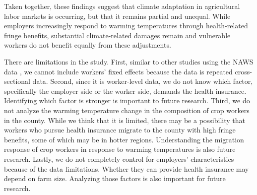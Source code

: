 \documentclass[12pt]{article}
\begin{document}
Taken together, these findings suggest that climate adaptation in agricultural labor markets is occurring, but that it remains partial and unequal. While employers increasingly respond to warming temperatures through health-related fringe benefits, substantial climate-related damages remain and vulnerable workers do not benefit equally from these adjustments.

There are limitations in the study. First, similar to other studies using the NAWS data \citep{kandilov_impact_2022, donkor_effects_2022, rutledge_health_2026}, we cannot include workers' fixed effects because the data is repeated cross-sectional data. Second, since it is worker-level data, we do not know which factor, specifically the employer side or the worker side, demands the health insurance. Identifying which factor is stronger is important to future research. Third, we do not analyze the warming temperature change in the composition of crop workers in the county. While we think that it is limited, there may be a possibility that workers who pursue health insurance migrate to the county with high fringe benefits, some of which may be in hotter regions. Understanding the migration response of crop workers in response to warming temperatures is also future research. Lastly, we do not completely control for employers' characteristics because of the data limitations. Whether they can provide health insurance may depend on farm size. Analyzing those factors is also important for future research. 



\newpage



\clearpage
\appendix
\end{document}

